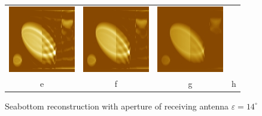 \documentclass{procDDs}
\begin{document}
\begin{figure}[h!]
\begin{tabular}{cccc}
		\includegraphics[width=0.2\linewidth]{k-img-13-7.jpg}&
		\includegraphics[width=0.2\linewidth]{k-img-13-8.jpg}&
		\includegraphics[width=0.2\linewidth]{k-img-13-9.jpg}\\
		e & f & g & h
	\end{tabular}
	\caption{Seabottom reconstruction with aperture of receiving antenna $\varepsilon=14^\circ$}
	\label{ris:desc5}
\end{figure}
\end{document}
